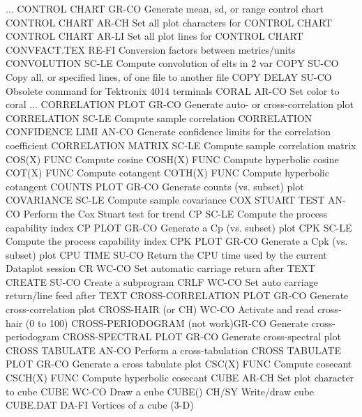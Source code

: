 ... CONTROL CHART           GR-CO Generate mean, sd, or range control chart
CONTROL CHART               AR-CH Set all plot characters for CONTROL CHART
CONTROL CHART               AR-LI Set all plot lines for CONTROL CHART
CONVFACT.TEX                RE-FI Conversion factors between metrics/units
CONVOLUTION                 SC-LE Compute convolution of elts in 2 var
COPY                        SU-CO Copy all, or specified lines, of one file to another file
COPY DELAY                  SU-CO Obsolete command for Tektronix 4014 terminals
CORAL                       AR-CO Set color to coral
... CORRELATION PLOT        GR-CO Generate auto- or cross-correlation plot
CORRELATION                 SC-LE Compute sample correlation
CORRELATION CONFIDENCE LIMI AN-CO Generate confidence limits for the correlation coefficient
CORRELATION MATRIX          SC-LE Compute sample correlation matrix
COS(X)                      FUNC  Compute cosine
COSH(X)                     FUNC  Compute hyperbolic cosine
COT(X)                      FUNC  Compute cotangent
COTH(X)                     FUNC  Compute hyperbolic cotangent
COUNTS PLOT                 GR-CO Generate counts (vs. subset) plot
COVARIANCE                  SC-LE Compute sample covariance
COX STUART TEST             AN-CO Perform the Cox Stuart test for trend
CP                          SC-LE Compute the process capability index
CP PLOT                     GR-CO Generate a Cp (vs. subset) plot
CPK                         SC-LE Compute the process capability index
CPK PLOT                    GR-CO Generate a Cpk (vs. subset) plot
CPU TIME                    SU-CO Return the CPU time used by the current Dataplot session
CR                          WC-CO Set automatic carriage return after TEXT
CREATE                      SU-CO Create a subprogram
CRLF                        WC-CO Set auto carriage return/line feed after TEXT
CROSS-CORRELATION PLOT      GR-CO Generate cross-correlation plot
CROSS-HAIR (or CH)          WC-CO Activate and read cross-hair (0 to 100)
CROSS-PERIODOGRAM (not work)GR-CO Generate cross-periodogram
CROSS-SPECTRAL PLOT         GR-CO Generate cross-spectral plot
CROSS TABULATE              AN-CO Perform a cross-tabulation
CROSS TABULATE PLOT         GR-CO Generate a cross tabulate plot
CSC(X)                      FUNC  Compute cosecant
CSCH(X)                     FUNC  Compute hyperbolic cosecant
CUBE                        AR-CH Set plot character to cube
CUBE                        WC-CO Draw a cube
CUBE()                      CH/SY Write/draw cube
CUBE.DAT                    DA-FI Vertices of a cube (3-D)
